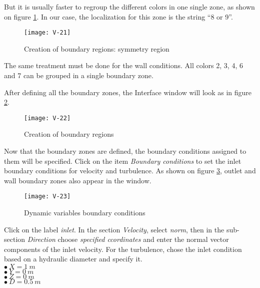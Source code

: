 But it is usually faster to regroup the different colors in one single zone, as
shown on figure \ref{fig24_e1}. In our case, the localization for this zone is
the string ``8 or 9''.

\begin{figure}[ht]
\begin{center}
\texttt{[image: V-21]}
\caption{Creation of boundary regions: symmetry region}
\label{fig24_e1}
\end{center}
\end{figure}


\clearpage
The same treatment must be done for the wall conditions. All colors 2, 3, 4, 6
and 7 can be grouped in a single boundary zone.

After defining all the boundary zones, the Interface window will look as in
figure \ref{fig25_e1}.

\begin{figure}[ht]
\begin{center}
\texttt{[image: V-22]}
\caption{Creation of boundary regions}
\label{fig25_e1}
\end{center}
\end{figure}


\clearpage
Now that the boundary zones are defined, the boundary conditions assigned to
them will be specified. Click on the item
{\itshape Boundary conditions} to set the inlet boundary conditions for
velocity and turbulence. As shown on figure \ref{fig26_e1}, outlet and wall boundary zones also appear in the window.

\begin{figure}[ht]
\begin{center}
\texttt{[image: V-23]}
\caption{Dynamic variables boundary conditions}
\label{fig26_e1}
\end{center}
\end{figure}


\clearpage
Click on the label {\itshape inlet}. In the section {\itshape Velocity}, select {\itshape norm}, then in the sub-section {\itshape Direction} choose {\itshape specified ccordinates} and enter the normal vector components of the inlet
velocity. For the turbulence, chose the inlet condition based on a hydraulic
diameter and specify it.\\
\hspace*{1cm}$\bullet\ X = 1\ m$\\
\hspace*{1cm}$\bullet\ Y = 0\ m$\\
\hspace*{1cm}$\bullet\ Z = 0\ m$\\
\hspace*{1cm}$\bullet\ D = 0.5\ m$


